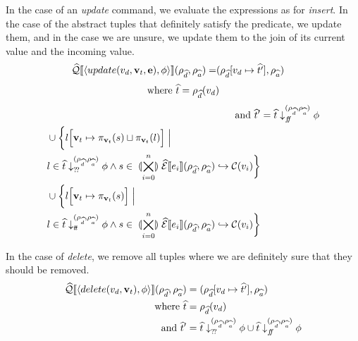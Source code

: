 In the case of an \textit{update} command, we evaluate the expressions as for \textit{insert}.
In the case of the abstract tuples that definitely satisfy the predicate, we update them, and in the case we are unsure, we update them to the join of its current value and the incoming value.
\begin{align}
    \widehat{\mathcal{Q}}\llbracket \langle update(v_d, \mathbf{v}_t, \mathbf{e}), \phi \rangle \rrbracket (\rho_{\widehat{d}}, \rho_{\widehat{a}}) = &(\rho_{\widehat{d}}[v_d\mapsto \widehat{t'}], \rho_{\widehat{a}})
\end{align}
\begin{align}
    \text{where } \widehat{t}=\rho_{\widehat{d}}(v_d) \nonumber
\end{align}
\begin{align} \nonumber
    \text{and }\widehat{t}' &= \widehat{t} \downarrow_{f\!\!f}^{(\rho_{\widehat{d}}, \rho_{\widehat{a}})} \phi \\
    \begin{split}
         &\cup \biggl\{ l\Bigl[ \mathbf{v}_t \mapsto \pi_{\mathbf{v}_t}(s) \sqcup \pi_{\mathbf{v}_t}(l) \Bigr] \;\Big|\;\\
         &l \in \widehat{t} \downarrow_{?\!?}^{(\rho_{\widehat{d}}, \rho_{\widehat{a}})} \phi \land s \in \;\llparenthesis\bigtimes_{i = 0}^{n}\rrparenthesis\; \widehat{\mathcal{E}}\llbracket e_i \rrbracket(\rho_{\widehat{d}}, \rho_{\widehat{a}}) \hookrightarrow \mathcal{C}(v_i)\biggr\} \nonumber
    \end{split} \\
    \begin{split}
        &\cup \biggl\{ l\Bigl[ \mathbf{v}_t \mapsto \pi_{\mathbf{v}_t}(s) \Bigr] \;\Big|\;\\
        &l \in \widehat{t} \downarrow_{t\!t}^{(\rho_{\widehat{d}}, \rho_{\widehat{a}})} \phi \land s \in \;\llparenthesis\bigtimes_{i = 0}^{n}\rrparenthesis\; \widehat{\mathcal{E}}\llbracket e_i \rrbracket(\rho_{\widehat{d}}, \rho_{\widehat{a}}) \hookrightarrow \mathcal{C}(v_i)\biggr\} \nonumber
    \end{split}
\end{align}

In the case of \textit{delete}, we remove all tuples where we are definitely sure that they should be removed.
\begin{align*}
    \widehat{\mathcal{Q}}\llbracket \langle delete(v_d, \mathbf{v}_t), \phi \rangle \rrbracket (\rho_{\widehat{d}}, \rho_{\widehat{a}}) &= (\rho_{\widehat{d}}[v_d\mapsto \widehat{t'}], \rho_{\widehat{a}}) \\
    \text{where } \widehat{t}&=\rho_{\widehat{d}}(v_d)\\
    \text{and }\widehat{t}' &= \widehat{t} \downarrow_{?\!?}^{(\rho_{\widehat{d}}, \rho_{\widehat{a}})} \phi \cup \widehat{t} \downarrow_{f\!\!f}^{(\rho_{\widehat{d}}, \rho_{\widehat{a}})} \phi
\end{align*}

